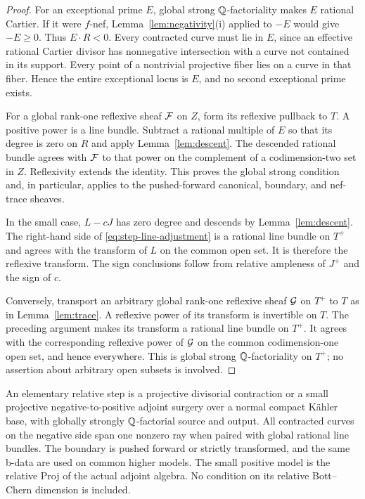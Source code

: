 \begin{proof}
For an exceptional prime $E$, global strong $\mathbb Q$-factoriality makes $E$
rational Cartier.  If it were $f$-nef,
Lemma~\ref{lem:negativity}\textup{(i)} applied to $-E$ would give
$-E\geq0$.  Thus $E\cdot R<0$.  Every contracted curve
must lie in $E$, since an effective rational Cartier divisor has
nonnegative intersection with a curve not contained in its support.
Every point of a nontrivial projective fiber lies on a curve in that
fiber.  Hence the entire exceptional locus is $E$, and no second
exceptional prime exists.

For a global rank-one reflexive sheaf $\mathcal F$ on $Z$, form its reflexive
pullback to $T$.  A positive power is a line bundle.  Subtract a
rational multiple of $E$ so that its degree is zero on $R$ and apply
Lemma~\ref{lem:descent}.  The descended rational bundle agrees with
$\mathcal F$ to that power on the complement of a codimension-two set in
$Z$.  Reflexivity extends the identity.  This proves the global strong
condition and, in particular, applies to the pushed-forward canonical,
boundary, and nef-trace sheaves.

In the small case, $L-cJ$ has zero degree and descends by
Lemma~\ref{lem:descent}.  The right-hand side of
\eqref{eq:step-line-adjustment} is a rational line bundle on $T^+$
and agrees with the transform of $L$ on the common open set.  It is
therefore the reflexive transform.  The sign conclusions follow from
relative ampleness of $J^+$ and the sign of $c$.

Conversely, transport an arbitrary global rank-one reflexive sheaf
$\mathcal G$ on $T^+$ to $T$ as in Lemma~\ref{lem:trace}.  A reflexive power
of its transform is invertible on $T$.  The preceding argument makes
its transform a rational line bundle on $T^+$.  It agrees with the
corresponding reflexive power of $\mathcal G$ on the common codimension-one
open set, and hence everywhere.  This is global strong $\mathbb Q$-factoriality
on $T^+$; no assertion about arbitrary open subsets is involved.
\end{proof}

\begin{definition}\label{def:relative-elementary}
An elementary relative step is a
projective divisorial contraction
or a small projective negative-to-positive adjoint surgery over a
normal compact K\"ahler base, with globally strongly $\mathbb Q$-factorial
source and output.  All contracted curves on the negative side span
one nonzero ray when paired with global rational line bundles.  The
boundary is pushed forward or strictly transformed, and the same
b-data are used on common higher models.  The small positive model is
the relative Proj of the actual adjoint algebra.  No condition on its
relative Bott--Chern dimension is included.
\end{definition}

